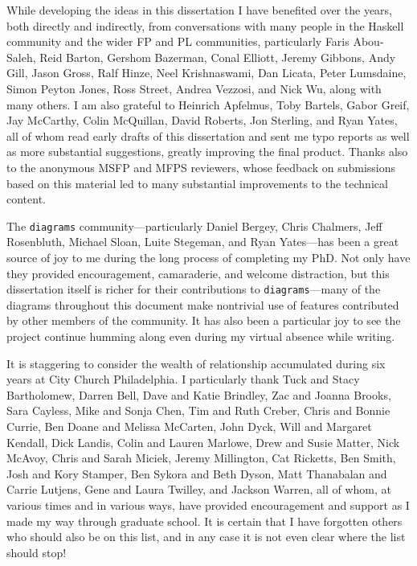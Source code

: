 While developing the ideas in this dissertation I have benefited over
the years, both directly and indirectly, from conversations with many
people in the Haskell community and the wider FP and PL communities,
particularly Faris Abou-Saleh, Reid Barton, Gershom Bazerman, Conal
Elliott, Jeremy Gibbons, Andy Gill, Jason Gross, Ralf Hinze, Neel
Krishnaswami, Dan Licata, Peter Lumsdaine, Simon Peyton Jones, Ross
Street, Andrea Vezzosi, and Nick Wu, along with many others.  I am
also grateful to Heinrich Apfelmus, Toby Bartels, Gabor Greif, Jay
McCarthy, Colin McQuillan, David Roberts, Jon Sterling, and Ryan
Yates, all of whom read early drafts of this dissertation and sent me
typo reports as well as more substantial suggestions, greatly
improving the final product.  Thanks also to the anonymous MSFP and
MFPS reviewers, whose feedback on submissions based on this material
led to many substantial improvements to the technical content.

The \texttt{diagrams} community---particularly Daniel Bergey, Chris
Chalmers, Jeff Rosenbluth, Michael Sloan, Luite Stegeman, and Ryan
Yates---has been a great source of joy to me during the long process
of completing my PhD.  Not only have they provided encouragement,
camaraderie, and welcome distraction, but this dissertation itself is
richer for their contributions to \texttt{diagrams}---many of the
diagrams throughout this document make nontrivial use of features
contributed by other members of the community.  It has also been a
particular joy to see the project continue humming along even during
my virtual absence while writing.

It is staggering to consider the wealth of relationship accumulated
during six years at City Church Philadelphia.  I particularly thank
Tuck and Stacy Bartholomew, Darren Bell, Dave and Katie Brindley, Zac
and Joanna Brooks, Sara Cayless, Mike and Sonja Chen, Tim and Ruth
Creber, Chris and Bonnie Currie, Ben Doane and Melissa McCarten, John
Dyck, Will and Margaret Kendall, Dick Landis, Colin and Lauren
Marlowe, Drew and Susie Matter, Nick McAvoy, Chris and Sarah Miciek,
Jeremy Millington, Cat Ricketts, Ben Smith, Josh and Kory Stamper, Ben
Sykora and Beth Dyson, Matt Thanabalan and Carrie Lutjens, Gene and
Laura Twilley, and Jackson Warren, all of whom, at various times and
in various ways, have provided encouragement and support as I made my
way through graduate school. It is certain that I have forgotten
others who should also be on this list, and in any case it is not even
clear where the list should stop!

